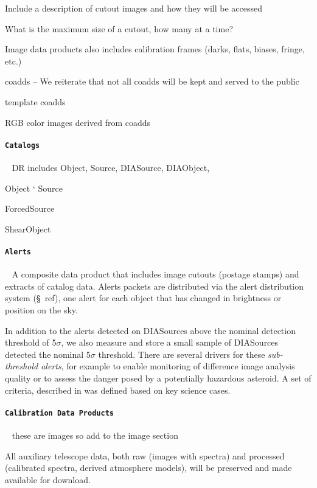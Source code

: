 Include a description of cutout images and how they will be accessed

What is the maximum size of a cutout, how many at a time?

Image data products also includes   calibration frames (darks, flats, biases, fringe, etc.) 

coadds -- We reiterate that not all coadds will be kept and served to the public

template coadds

RGB color images derived from coadds

\paragraph {\tt  Catalogs}~
DR includes Object, Source, DIASource, DIAObject,

Object
`
Source 

ForcedSource

ShearObject

\paragraph {\tt  Alerts}~
A composite data product that includes image cutouts (postage stamps) and extracts of catalog data.
Alerts packets are distributed via the alert distribution system (\S~ref), one alert for each object that 	has changed in brightness or position on the sky.



In addition to the alerts detected on DIASources above the nominal detection threshold of 5$\sigma$, we  also measure and store a small sample of DIASources detected the nominal 5$\sigma$ threshold.
There are several drivers  for these \emph{sub-threshold alerts}, for example to enable monitoring of difference image analysis quality or to assess the danger posed by a potentially hazardous asteroid.
A set of criteria, described in \citep{dmtn-228}  was defined  based on key science cases.


\paragraph {\tt  Calibration Data Products} ~
these are images so add to the image section

All auxiliary telescope data, both raw (images with spectra) and processed (calibrated spectra,
derived atmosphere models), will be preserved and made available for download.

